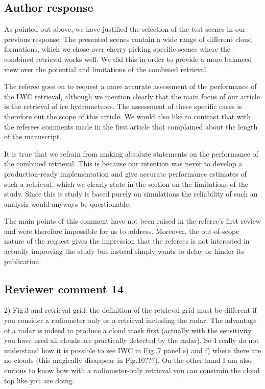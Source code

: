 \begin{description}
\subsection*{Author response}

As pointed out above, we have justified the selection of the test scenes in our
previous response. The presented scenes contain a wide range of different cloud
formations, which we chose over cherry picking specific scenes where the
combined retrieval works well. We did this in order to provide a more balanced
view over the potential and limitations of the combined retrieval.

The referee goes on to request a more accurate assessment of the performance
of the LWC retrieval, although we mention clearly that the main focus of our
article is the retrieval of ice hydrometeors. The assessment of these specific
cases is therefore out the scope of this article. We would also like to contrast
that with the referees comments made in the first article that complained about
the length of the manuscript.

It is true that we refrain from making absolute statements on the performance of
the combined retrieval. This is because our intention was never to develop a
production-ready implementation and give accurate performance estimates of such
a retrieval, which we clearly state in the section on the limitations of the
study. Since this is study is based purely on simulations the reliability of
such an analysis would anyways be questionable.

The main points of this comment have not been raised in the referee's first review
and were therefore impossible for us to address. Moreover, the out-of-scope nature of the
request gives the impression that the referees is not interested in actually improving
the study but instead simply wants to delay or hinder its publication.


\subsection*{Reviewer comment 14}

2) Fig.3 and retrieval grid: the definition of the retrieval grid must be
different if you consider a radiometer only or a retrieval including the radar.
The advantage of a radar is indeed to produce a cloud mask first (actually with
the sensitivity you have used all clouds are practically detected by the radar).
So I really do not understand how it is possible to see IWC in Fig,.7 panel e)
and f) where there are no clouds (this magically disappear in Fig.10???). On the
other hand I am also curious to know how with a radiometer-only retrieval you
can constrain the cloud top like you are doing.


\end{description}
